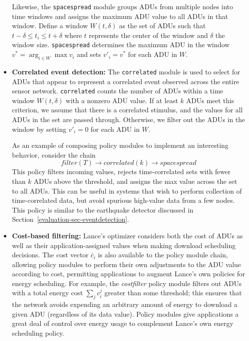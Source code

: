 \begin{itemize}
\hspace{0.25in} Likewise, the \texttt{spacespread} module groups ADUs from
multiple nodes into time windows and assigns the maximum ADU value to all
ADUs in that window. Define a window $W(t,\delta)$ as the set of ADUs such
that $t-\delta \leq t_i \leq t+\delta$ where $t$ represents the center of the
window and $\delta$ the window size. \texttt{spacespread} determines the
maximum ADU in the window $v^* = \arg_{i \in W} \max v_i$ and sets $v'_i =
v^{*}$ for each ADU in $W$.

\vfill\eject

\item \textbf{Correlated event detection:} The \texttt{correlated} module is
used to select for ADUs that appear to represent a correlated event observed
across the entire sensor network. \texttt{correlated} counts the number of
ADUs within a time window $W(t,\delta)$ with a nonzero ADU value. If at least
$k$ ADUs meet this criterion, we assume that there is a correlated stimulus,
and the values for all ADUs in the set are passed through. Otherwise, we
filter out the ADUs in the window by setting $v'_i = 0$ for each ADU in $W$.

\hspace{0.25in} As an example of composing policy modules to implement an
interesting behavior, consider the chain \[
\mathit{filter}(T)\rightarrow\mathit{correlated}(k)\rightarrow\mathit{spacespread}
\] This policy filters incoming values, rejects time-correlated sets with
fewer than $k$ ADUs above the threshold, and assigns the max value across the
set to all ADUs. This can be useful in systems that wish to perform
collection of time-correlated data, but avoid spurious high-value data from a
few nodes. This policy is similar to the earthquake detector discussed in
Section~\ref{evaluation-sec-eventdetection}.

\item \textbf{Cost-based filtering:} Lance's optimizer considers both the
cost of ADUs as well as their application-assigned values when making
download scheduling decisions. The cost vector $\bar{c}_i$ is also available
to the policy module chain, allowing policy modules to perform their own
adjustments to the ADU value according to cost, permitting applications to
augment Lance's own policies for energy scheduling. For example, the
\textit{costfilter} policy module filters out ADUs with a total energy cost
$\sum_j c_i^j$ greater than some threshold; this ensures that the network
avoids expending an arbitrary amount of energy to download a given ADU
(regardless of its data value). Policy modules give applications a great deal
of control over energy usage to complement Lance's own energy scheduling
policy.


\end{itemize}
